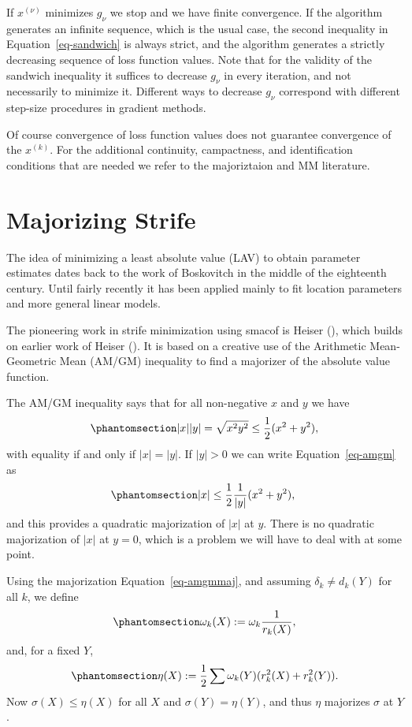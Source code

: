 \documentclass[
  12pt,
  letterpaper,
  DIV=11,
  numbers=noendperiod]{scrartcl}
\theoremstyle{definition}
\theoremstyle{plain}
\theoremstyle{plain}
\theoremstyle{plain}
\theoremstyle{definition}
\theoremstyle{remark}
\begin{document}
If \(x^{(\nu)}\) minimizes \(g_\nu\) we stop and we have finite
convergence. If the algorithm generates an infinite sequence, which is
the usual case, the second inequality in Equation~\ref{eq-sandwich} is
always strict, and the algorithm generates a strictly decreasing
sequence of loss function values. Note that for the validity of the
sandwich inequality it suffices to decrease \(g_\nu\) in every
iteration, and not necessarily to minimize it. Different ways to
decrease \(g_\nu\) correspond with different step-size procedures in
gradient methods.

Of course convergence of loss function values does not guarantee
convergence of the \(x^{(k)}\). For the additional continuity,
campactness, and identification conditions that are needed we refer to
the majoriztaion and MM literature.

\section{Majorizing Strife}\label{sec-majorization}

The idea of minimizing a least absolute value (LAV) to obtain parameter
estimates dates back to the work of Boskovitch in the middle of the
eighteenth century. Until fairly recently it has been applied mainly to
fit location parameters and more general linear models.

The pioneering work in strife minimization using smacof is Heiser
(), which builds on earlier work of Heiser
(). It is based on a creative use of the
Arithmetic Mean-Geometric Mean (AM/GM) inequality to find a majorizer of
the absolute value function.

The AM/GM inequality says that for all non-negative \(x\) and \(y\) we
have \begin{equation}\phantomsection\label{eq-amgm}{
|x||y|=\sqrt{x^2y^2}\leq\frac12(x^2+y^2),
}\end{equation} with equality if and only if \(|x|=|y|\). If \(|y|>0\)
we can write Equation~\ref{eq-amgm} as
\begin{equation}\phantomsection\label{eq-amgmmaj}{
|x|\leq\frac12\frac{1}{|y|}(x^2+y^2),\
}\end{equation} and this provides a quadratic majorization of \(|x|\) at
\(y\). There is no quadratic majorization of \(|x|\) at \(y=0\), which
is a problem we will have to deal with at some point.

Using the majorization Equation~\ref{eq-amgmmaj}, and assuming
\(\delta_k\not=d_k(Y)\) for all \(k\), we define
\begin{equation}\phantomsection\label{eq-wk1def}{
\omega_k(X):=\omega_k\frac{1}{r_k(X)},
}\end{equation} and, for a fixed \(Y\),
\begin{equation}\phantomsection\label{eq-strifemaj}{
\eta(X):=\frac12\sum \omega_k(Y)(r_k^2(X)+r_k^2(Y)).
}\end{equation} Now \(\sigma(X)\leq\eta(X)\) for all \(X\) and
\(\sigma(Y)=\eta(Y)\), and thus \(\eta\) majorizes \(\sigma\) at \(Y\).
\end{document}
